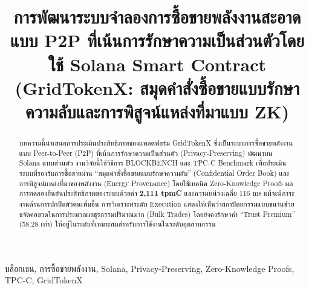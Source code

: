 \documentclass[conference,10pt]{IEEEtran}
\begin{document}
\sloppy

\setlength{\headheight}{23pt}
\pagestyle{fancy}
\fancyhf{}
\rhead{\today}
\renewcommand{\headrulewidth}{0.4pt}
\renewcommand{\footrulewidth}{0pt}


\title{การพัฒนาระบบจำลองการซื้อขายพลังงานสะอาดแบบ P2P ที่เน้นการรักษาความเป็นส่วนตัวโดยใช้ Solana Smart Contract\\
\large (GridTokenX: สมุดคำสั่งซื้อขายแบบรักษาความลับและการพิสูจน์แหล่งที่มาแบบ ZK)}

\author{
}

\maketitle

\begin{abstract}
บทความนี้นำเสนอการประเมินประสิทธิภาพของแพลตฟอร์ม GridTokenX ซึ่งเป็นระบบการซื้อขายพลังงานแบบ Peer-to-Peer (P2P) ที่เน้นการรักษาความเป็นส่วนตัว (Privacy-Preserving) พัฒนาบน Solana แบบส่วนตัว งานวิจัยนี้ใช้วิธีการ BLOCKBENCH และ TPC-C Benchmark เพื่อประเมินระบบที่รองรับการซื้อขายผ่าน ``สมุดคำสั่งซื้อขายแบบรักษาความลับ'' (Confidential Order Book) และการพิสูจน์แหล่งที่มาของพลังงาน (Energy Provenance) โดยใช้เทคนิค Zero-Knowledge Proofs ผลการทดลองยืนยันประสิทธิภาพของระบบด้วยค่า \textbf{2,111 tpmC} และความหน่วงเฉลี่ย 116 ms แม้จะมีภาระงานด้านการปกปิดตัวตนเพิ่มขึ้น การวิเคราะห์ระดับ Execution แสดงให้เห็นว่าสถาปัตยกรรมแบบขนานช่วยขจัดคอขวดในการประมวลผลธุรกรรมปริมาณมาก (Bulk Trades) โดยยังคงรักษาค่า ``Trust Premium'' (58.28 เท่า) ให้อยู่ในระดับที่เหมาะสมสำหรับการใช้งานในระดับอุตสาหกรรม
\end{abstract}

\begin{IEEEkeywords}
บล็อกเชน, การซื้อขายพลังงาน, Solana, Privacy-Preserving, Zero-Knowledge Proofs, TPC-C, GridTokenX
\end{IEEEkeywords}
\end{document}
